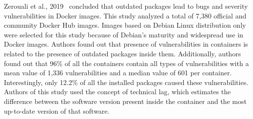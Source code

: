 Zerouali et al., 2019~\cite{zerouali2019relation} concluded that
outdated packages lead to bugs and severity vulnerabilities in Docker
images. This study analyzed a total of 7,380 official and
community Docker Hub images. Images
based on Debian Linux distribution only were selected
for this study because of Debian's
maturity and widespread use in Docker images.
Authors found out that presence of vulnerabilities
in containers is related to the presence of outdated
packages inside them. Additionally, authors
found out that 96\% of all the containers contain
all types of vulnerabilities with a mean value of 1,336
vulnerabilities and a median value of 601 per container.
Interestingly, only 12.2\% of
all the installed packages caused these vulnerabilities.
Authors of this study used the
concept of technical lag, which estimates the difference
between the software version present inside the
container and the most up-to-date version of that software. 


